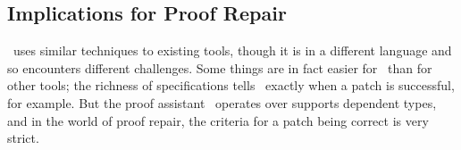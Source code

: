 

\subsection{Implications for Proof Repair}

\sysname\ uses similar techniques to existing tools, though it is in a different language
and so encounters different challenges. Some things are in fact easier for \sysname\ than for other tools;
the richness of specifications tells \sysname\ exactly when a patch is successful, for example. 
But the proof assistant \sysname\ operates over supports dependent types, and in the world of proof repair,
the criteria for a patch being correct is very strict. 

